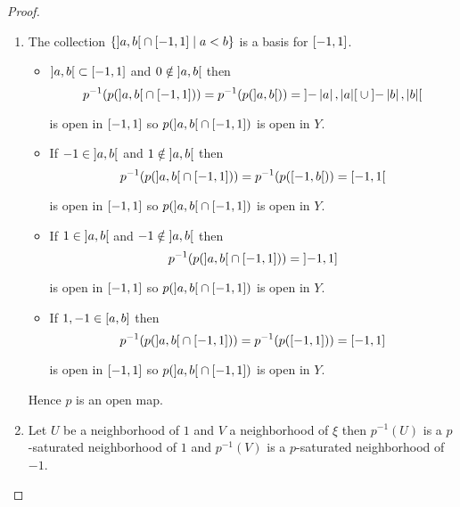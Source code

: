 \begin{proof}
	\begin{enumerate}[label={(\alph*)}]
		\item The collection \( \left\{ \left\rbrack{a, b}\right\lbrack \cap \left\lbrack{-1, 1}\right\rbrack \mid a < b \right\} \) is a basis for \( \left\lbrack{-1, 1}\right\rbrack \).
		      \begin{itemize}
			      \item \( \left\rbrack{a, b}\right\lbrack \subset \left\lbrack{-1, 1}\right\rbrack \) and \( 0 \notin \left\rbrack{a, b}\right\lbrack \) then
			            \[
				            p^{-1}(p(\left\rbrack{a, b}\right\lbrack \cap \left\lbrack{-1, 1}\right\rbrack)) = p^{-1}(p(\left\rbrack{a, b}\right\lbrack)) = \left\rbrack{-\left\vert a \right\vert, \left\vert a \right\vert}\right\lbrack \cup \left\rbrack{-\left\vert b \right\vert, \left\vert b \right\vert}\right\lbrack
			            \]

			            is open in \( \left\lbrack{-1, 1}\right\rbrack \) so \( p(\left\rbrack{a, b}\right\lbrack \cap \left\lbrack{-1, 1}\right\rbrack) \) is open in \( Y \).
			      \item If \( -1 \in \left\rbrack{a, b}\right\lbrack \) and \( 1 \notin \left\rbrack{a, b}\right\lbrack \) then
			            \[
				            p^{-1}(p(\left\rbrack{a, b}\right\lbrack \cap \left\lbrack{-1, 1}\right\rbrack)) = p^{-1}(p(\left\lbrack{-1, b}\right\lbrack)) = \left\lbrack{-1, 1}\right\lbrack
			            \]

			            is open in \( \left\lbrack{-1, 1}\right\rbrack \) so \( p(\left\rbrack{a, b}\right\lbrack \cap \left\lbrack{-1, 1}\right\rbrack) \) is open in \( Y \).
			      \item If \( 1 \in \left\rbrack{a, b}\right\lbrack \) and \( -1 \notin \left\rbrack{a, b}\right\lbrack \) then
			            \[
				            p^{-1}(p(\left\rbrack{a, b}\right\lbrack \cap \left\lbrack{-1, 1}\right\rbrack)) = \left\rbrack{-1, 1}\right\rbrack
			            \]

			            is open in \( \left\lbrack{-1, 1}\right\rbrack \) so \( p(\left\rbrack{a, b}\right\lbrack \cap \left\lbrack{-1, 1}\right\rbrack) \) is open in \( Y \).
			      \item If \( 1, -1 \in \left\lbrack{a, b}\right\rbrack \) then
			            \[
				            p^{-1}(p(\left\rbrack{a, b}\right\lbrack \cap \left\lbrack{-1, 1}\right\rbrack)) = p^{-1}(p(\left\lbrack{-1, 1}\right\rbrack)) = \left\lbrack{-1, 1}\right\rbrack
			            \]

			            is open in \( \left\lbrack{-1, 1}\right\rbrack \) so \( p(\left\rbrack{a, b}\right\lbrack \cap \left\lbrack{-1, 1}\right\rbrack) \) is open in \( Y \).
		      \end{itemize}

		      Hence \( p \) is an open map.
		\item Let \( U \) be a neighborhood of \( 1 \) and \( V \) a neighborhood of \( \xi \) then \( p^{-1}(U) \) is a \(p\)-saturated neighborhood of \( 1 \) and \( p^{-1}(V) \) is a \( p \)-saturated neighborhood of \( -1 \).


\end{enumerate}
\end{proof}

